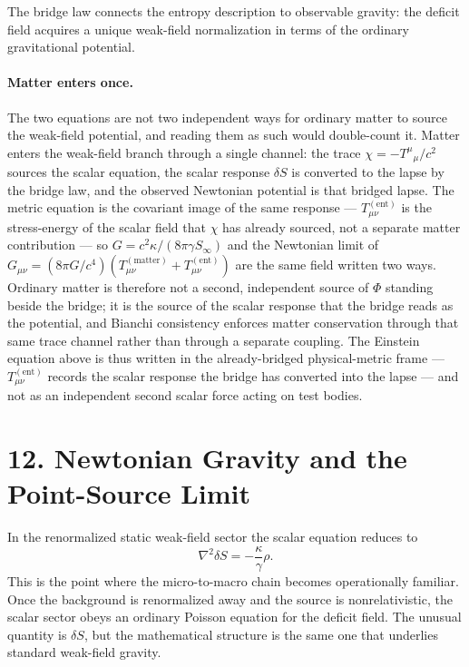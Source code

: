 \documentclass[11pt]{article}
\begin{document}
The bridge law connects the entropy description to observable gravity: the deficit field acquires a unique weak-field normalization in terms of the ordinary gravitational potential.

\paragraph{Matter enters once.}
The two equations are not two independent ways for ordinary matter to source the weak-field potential, and reading them as such would double-count it. Matter enters the weak-field branch through a single channel: the trace $\chi=-T^\mu{}_\mu/c^2$ sources the scalar equation, the scalar response $\delta S$ is converted to the lapse by the bridge law, and the observed Newtonian potential is that bridged lapse. The metric equation is the covariant image of the same response --- $T_{\mu\nu}^{(\mathrm{ent})}$ is the stress-energy of the scalar field that $\chi$ has already sourced, not a separate matter contribution --- so $G=c^2\kappa/(8\pi\gamma S_\infty)$ and the Newtonian limit of $G_{\mu\nu}=(8\pi G/c^4)(T^{(\mathrm{matter})}_{\mu\nu}+T^{(\mathrm{ent})}_{\mu\nu})$ are the same field written two ways. Ordinary matter is therefore not a second, independent source of $\Phi$ standing beside the bridge; it is the source of the scalar response that the bridge reads as the potential, and Bianchi consistency enforces matter conservation through that same trace channel rather than through a separate coupling. The Einstein equation above is thus written in the already-bridged physical-metric frame --- $T^{(\mathrm{ent})}_{\mu\nu}$ records the scalar response the bridge has converted into the lapse --- and not as an independent second scalar force acting on test bodies.

\section{12. Newtonian Gravity and the Point-Source Limit}

In the renormalized static weak-field sector the scalar equation reduces to
\[
\nabla^2\delta S=-\frac{\kappa}{\gamma}\rho.
\]
This is the point where the micro-to-macro chain becomes operationally familiar. Once the background is renormalized away and the source is nonrelativistic, the scalar sector obeys an ordinary Poisson equation for the deficit field. The unusual quantity is $\delta S$, but the mathematical structure is the same one that underlies standard weak-field gravity.
\end{document}
